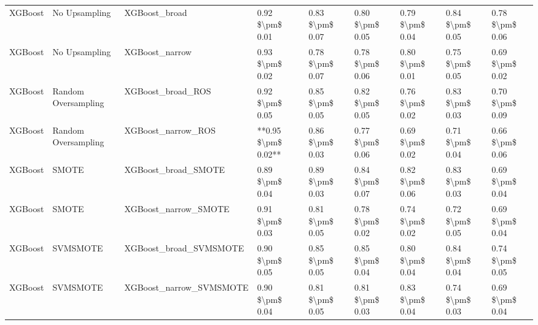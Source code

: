 \begin{tabular}{lllllllll}
                        XGBoost &                 No Upsampling &                                XGBoost\_broad &     0.92 \$\textbackslash pm\$ 0.01 &           0.83 \$\textbackslash pm\$ 0.07 &       0.80 \$\textbackslash pm\$ 0.05 &        0.79 \$\textbackslash pm\$ 0.04 &                         0.84 \$\textbackslash pm\$ 0.05 & 0.78 \$\textbackslash pm\$ 0.06 \\
                        XGBoost &                 No Upsampling &                               XGBoost\_narrow &     0.93 \$\textbackslash pm\$ 0.02 &           0.78 \$\textbackslash pm\$ 0.07 &       0.78 \$\textbackslash pm\$ 0.06 &        0.80 \$\textbackslash pm\$ 0.01 &                         0.75 \$\textbackslash pm\$ 0.05 & 0.69 \$\textbackslash pm\$ 0.02 \\
                        XGBoost &           Random Oversampling &                            XGBoost\_broad\_ROS &     0.92 \$\textbackslash pm\$ 0.05 &           0.85 \$\textbackslash pm\$ 0.05 &       0.82 \$\textbackslash pm\$ 0.05 &        0.76 \$\textbackslash pm\$ 0.02 &                         0.83 \$\textbackslash pm\$ 0.03 & 0.70 \$\textbackslash pm\$ 0.09 \\
                        XGBoost &           Random Oversampling &                           XGBoost\_narrow\_ROS & **0.95 \$\textbackslash pm\$ 0.02** &           0.86 \$\textbackslash pm\$ 0.03 &       0.77 \$\textbackslash pm\$ 0.06 &        0.69 \$\textbackslash pm\$ 0.02 &                         0.71 \$\textbackslash pm\$ 0.04 & 0.66 \$\textbackslash pm\$ 0.06 \\
                        XGBoost &                         SMOTE &                          XGBoost\_broad\_SMOTE &     0.89 \$\textbackslash pm\$ 0.04 &           0.89 \$\textbackslash pm\$ 0.03 &       0.84 \$\textbackslash pm\$ 0.07 &        0.82 \$\textbackslash pm\$ 0.06 &                         0.83 \$\textbackslash pm\$ 0.03 & 0.69 \$\textbackslash pm\$ 0.04 \\
                        XGBoost &                         SMOTE &                         XGBoost\_narrow\_SMOTE &     0.91 \$\textbackslash pm\$ 0.03 &           0.81 \$\textbackslash pm\$ 0.05 &       0.78 \$\textbackslash pm\$ 0.02 &        0.74 \$\textbackslash pm\$ 0.02 &                         0.72 \$\textbackslash pm\$ 0.05 & 0.69 \$\textbackslash pm\$ 0.04 \\
                        XGBoost &                      SVMSMOTE &                       XGBoost\_broad\_SVMSMOTE &     0.90 \$\textbackslash pm\$ 0.05 &           0.85 \$\textbackslash pm\$ 0.05 &       0.85 \$\textbackslash pm\$ 0.04 &        0.80 \$\textbackslash pm\$ 0.04 &                         0.84 \$\textbackslash pm\$ 0.04 & 0.74 \$\textbackslash pm\$ 0.05 \\
                        XGBoost &                      SVMSMOTE &                      XGBoost\_narrow\_SVMSMOTE &     0.90 \$\textbackslash pm\$ 0.04 &           0.81 \$\textbackslash pm\$ 0.05 &       0.81 \$\textbackslash pm\$ 0.03 &        0.83 \$\textbackslash pm\$ 0.04 &                         0.74 \$\textbackslash pm\$ 0.03 & 0.69 \$\textbackslash pm\$ 0.04 \\
\bottomrule
\end{tabular}

